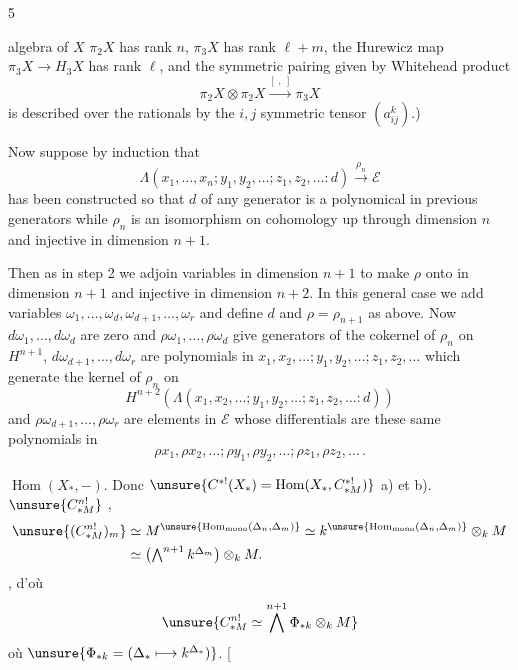 \begin{flushright}5\end{flushright}

algebra of $X$ \uline{}
$\pi_2X$ has rank $n$, $\pi_3X$ has rank $\ell+m$, the Hurewicz map
$\pi_3X\longrightarrow H_3X$ has rank $\ell$, and the symmetric pairing given by Whitehead product
\[
\pi_2X\otimes\pi_2X\xrightarrow{[\ ,\ ]}\pi_3X
\]
is described over the rationals by the $i,j$ symmetric tensor $(a^k_{ij})$.)

Now suppose by induction that
\[
\Lambda(x_1,\ldots,x_n;y_1,y_2,\ldots;z_1,z_2,\ldots:d)
\xrightarrow{\rho_n}\mathcal E
\]
has been constructed so that $d$ of any generator is a polynomical in previous generators while $\rho_n$ is an isomorphism on cohomology up through dimension $n$ and injective in dimension $n+1$.

Then as in step 2 we adjoin variables in dimension $n+1$ to make $\rho$ onto in dimension $n+1$ and injective in dimension $n+2$. In this general case we add variables
$\omega_1,\ldots,\omega_d,\omega_{d+1},\ldots,\omega_r$
and define $d$ and $\rho=\rho_{n+1}$ as above.
Now $d\omega_1,\ldots,d\omega_d$ are zero and
$\rho\omega_1,\ldots,\rho\omega_d$ give generators of the cokernel of $\rho_n$ on $H^{n+1}$,
$d\omega_{d+1},\ldots,d\omega_r$ are polynomials in
$x_1,x_2,\ldots;y_1,y_2,\ldots;z_1,z_2,\ldots$
which generate the kernel of $\rho_n$ on
\[
H^{n+2}(\Lambda(x_1,x_2,\ldots;y_1,y_2,\ldots;z_1,z_2,\ldots:d))
\]
and $\rho\omega_{d+1},\ldots,\rho\omega_r$ are elements in $\mathcal E$ whose differentials are these same polynomials in
\[
\rho x_1,\rho x_2,\ldots;\rho y_1,\rho y_2,\ldots;\rho z_1,\rho z_2,\ldots\,.
\]

 
$\operatorname{Hom}(X_*,-)$.
Donc
$\unsure{C^{*!}(X_*)=\operatorname{Hom}(X_*,C_{*M}^{*!})}$
 a) et b).
 $\unsure{C_{*M}^{n!}}$ ,
  
\[
\begin{aligned}
\unsure{(C_{*M}^{n!})_m}
&\simeq M^{\unsure{\operatorname{Hom}_{\mathrm{mono}}(\Delta_n,\Delta_m)}}
\simeq k^{\unsure{\operatorname{Hom}_{\mathrm{mono}}(\Delta_n,\Delta_m)}}\otimes_k M\\
&\simeq \bigl(\textstyle\bigwedge^{n+1}k^{\Delta_m}\bigr)\otimes_k M.
\end{aligned}
\]
 , d'où
\[
\unsure{C_{*M}^{n!}\simeq\bigwedge^{n+1}\Phi_{*k}\otimes_k M}
\]
où $\unsure{\Phi_{*k}=(\Delta_*\longmapsto k^{\Delta_*})}$.
[   

